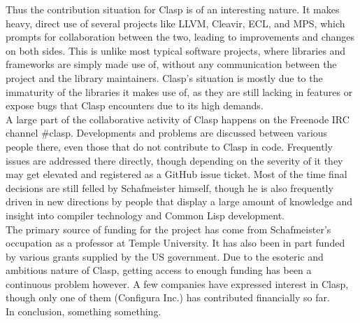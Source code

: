 Thus the contribution situation for Clasp is of an interesting nature. It makes heavy, direct use of several projects like LLVM, Cleavir, ECL, and MPS, which prompts for collaboration between the two, leading to improvements and changes on both sides. This is unlike most typical software projects, where libraries and frameworks are simply made use of, without any communication between the project and the library maintainers. Clasp's situation is mostly due to the immaturity of the libraries it makes use of, as they are still lacking in features or expose bugs that Clasp encounters due to its high demands. \\

A large part of the collaborative activity of Clasp happens on the Freenode IRC channel \#clasp. Developments and problems are discussed between various people there, even those that do not contribute to Clasp in code. Frequently issues are addressed there directly, though depending on the severity of it they may get elevated and registered as a GitHub issue ticket. Most of the time final decisions are still felled by Schafmeister himself, though he is also frequently driven in new directions by people that display a large amount of knowledge and insight into compiler technology and Common Lisp development. \\

The primary source of funding for the project has come from Schafmeister's occupation as a professor at Temple University. It has also been in part funded by various grants supplied by the US government\cite{clasp-grants}. Due to the esoteric and ambitious nature of Clasp, getting access to enough funding has been a continuous problem however. A few companies have expressed interest in Clasp, though only one of them (Configura Inc.) has contributed financially so far. \\

In conclusion, something something.

